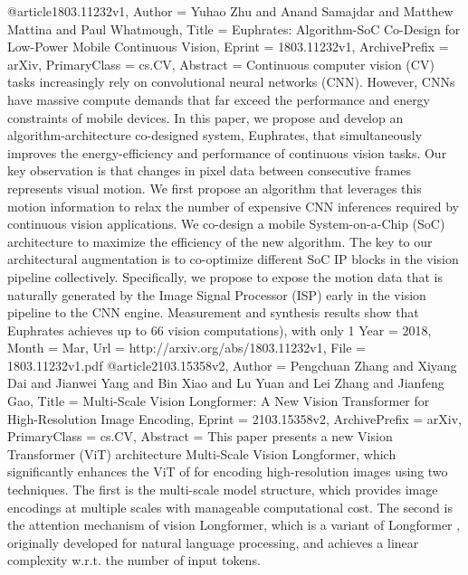 @article{1803.11232v1,
Author        = {Yuhao Zhu and Anand Samajdar and Matthew Mattina and Paul Whatmough},
Title         = {Euphrates: Algorithm-SoC Co-Design for Low-Power Mobile Continuous
  Vision},
Eprint        = {1803.11232v1},
ArchivePrefix = {arXiv},
PrimaryClass  = {cs.CV},
Abstract      = {Continuous computer vision (CV) tasks increasingly rely on convolutional
neural networks (CNN). However, CNNs have massive compute demands that far
exceed the performance and energy constraints of mobile devices. In this paper,
we propose and develop an algorithm-architecture co-designed system, Euphrates,
that simultaneously improves the energy-efficiency and performance of
continuous vision tasks.
  Our key observation is that changes in pixel data between consecutive frames
represents visual motion. We first propose an algorithm that leverages this
motion information to relax the number of expensive CNN inferences required by
continuous vision applications. We co-design a mobile System-on-a-Chip (SoC)
architecture to maximize the efficiency of the new algorithm. The key to our
architectural augmentation is to co-optimize different SoC IP blocks in the
vision pipeline collectively. Specifically, we propose to expose the motion
data that is naturally generated by the Image Signal Processor (ISP) early in
the vision pipeline to the CNN engine. Measurement and synthesis results show
that Euphrates achieves up to 66%
vision computations), with only 1%
Year          = {2018},
Month         = {Mar},
Url           = {http://arxiv.org/abs/1803.11232v1},
File          = {1803.11232v1.pdf}
}
@article{2103.15358v2,
Author        = {Pengchuan Zhang and Xiyang Dai and Jianwei Yang and Bin Xiao and Lu Yuan and Lei Zhang and Jianfeng Gao},
Title         = {Multi-Scale Vision Longformer: A New Vision Transformer for
  High-Resolution Image Encoding},
Eprint        = {2103.15358v2},
ArchivePrefix = {arXiv},
PrimaryClass  = {cs.CV},
Abstract      = {This paper presents a new Vision Transformer (ViT) architecture Multi-Scale
Vision Longformer, which significantly enhances the ViT of
\cite{dosovitskiy2020image} for encoding high-resolution images using two
techniques. The first is the multi-scale model structure, which provides image
encodings at multiple scales with manageable computational cost. The second is
the attention mechanism of vision Longformer, which is a variant of Longformer
\cite{beltagy2020longformer}, originally developed for natural language
processing, and achieves a linear complexity w.r.t. the number of input tokens.
}}}
